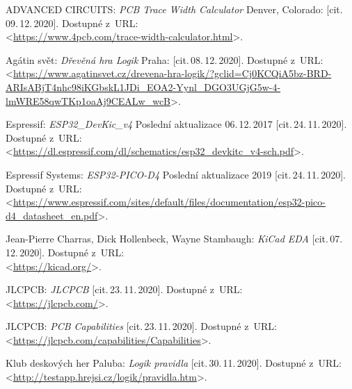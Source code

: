 

\begin{thebibliography}{99}
    ADVANCED CIRCUITS:
    \emph{PCB Trace Width Calculator}
    Denver, Colorado: [cit.\,09.\,12.\,2020].
    Dostupné z~URL:\\
    <\url{https://www.4pcb.com/trace-width-calculator.html}>.

    Agátin svět:
    \emph{Dřevěná hra Logik}
    Praha: [cit.\,08.\,12.\,2020].
    Dostupné z~URL:\\
    <\url{https://www.agatinsvet.cz/drevena-hra-logik/?gclid=Cj0KCQiA5bz-BRD-ARIsABjT4nhc98iKGbskL1JDi_EOA2-Yynl_DGO3UGjG5w-4-lmWRE58qwTKp1oaAj9CEALw_wcB}>.

    Espressif:
    \emph{ESP32\_DevKic\_v4}
    Poslední aktualizace 06.\,12.\,2017 [cit.\,24.\,11.\,2020].
    Dostupné z~URL:\\
    <\url{https://dl.espressif.com/dl/schematics/esp32_devkitc_v4-sch.pdf}>.

    Espressif Systems:
    \emph{ESP32-PICO-D4}
    Poslední aktualizace 2019 [cit.\,24.\,11.\,2020].
    Dostupné z~URL:\\
    <\url{https://www.espressif.com/sites/default/files/documentation/esp32-pico-d4_datasheet_en.pdf}>.

    Jean-Pierre Charras, Dick Hollenbeck, Wayne Stambaugh:
    \emph{KiCad EDA}
    [cit.\,07.\,12.\,2020].
    Dostupné z~URL:\\
    <\url{https://kicad.org/}>.

    JLCPCB:
    \emph{JLCPCB}
    [cit.\,23.\,11.\,2020].
    Dostupné z~URL:\\
    <\url{https://jlcpcb.com/}>.

    JLCPCB:
    \emph{PCB Capabilities}
    [cit.\,23.\,11.\,2020].
    Dostupné z~URL:\\
    <\url{https://jlcpcb.com/capabilities/Capabilities}>.

    Klub deskových her Paluba:
    \emph{Logik pravidla}
    [cit.\,30.\,11.\,2020].
    Dostupné z~URL:\\
    <\url{http://testapp.hrejsi.cz/logik/pravidla.htm}>.


\end{thebibliography}
